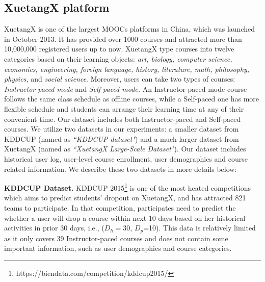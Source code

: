\subsection{XuetangX platform}

	XuetangX is one of the largest MOOCs platforms in China, which was launched in October 2013. It has provided over 1000 courses and attracted more than 10,000,000 registered users up to now.  XuetangX type courses into twelve categories based on their learning objects: \textit{art, biology, computer science, economics, engineering, foreign language, history, literature, math, philosophy, physics,} and \textit{social science}. Moreover, users can take two types of courses: \textit{Instructor-paced mode }and \textit{Self-paced mode.} An Instructor-paced mode course follows the same class schedule as offline courses, while a Self-paced one has more flexible schedule and students can arrange their learning time at any of their convenient time.
	Our dataset includes both Instructor-paced  and Self-paced courses. We utilize two datasets in our experiments: a smaller dataset from KDDCUP (named as \textit{``KDDCUP dataset"}) and a much larger dataset from XuetangX (named as \textit{``XuetangX Large-Scale Dataset"}). Our dataset includes historical user log, user-level course enrollment, user demographics and course related information. We describe these two datasets in more details below:
    
	 \noindent\textbf{KDDCUP Dataset.}
	KDDCUP 2015\footnote{https://biendata.com/competition/kddcup2015/} is one of the most heated competitions which aims to predict students' dropout on XuetangX, and has attracted 821 teams to participate. In that competition, participates need to predict the whether a user will drop a course within next 10 days based on her historical activities in prior 30 days, i.e., ($D_h=30$, $D_p$=10). 
	 This data is relatively limited as it only covers 39 Instructor-paced courses and does not contain some important information, such as user demographics and course categories.
	
